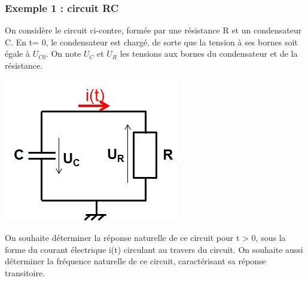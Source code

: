 \documentclass[]{report}
\begin{document}
	\subsubsection{Exemple 1 : circuit RC}
		
	\begin{minipage}[l]{0.7\linewidth}
		On considère le circuit ci-contre, formée par une résistance R et un condensateur C. En t= 0, le condensateur est chargé, de sorte que la tension à ses bornes soit égale à $U_{C0}$. On note $U_{C}$ et $U_{R}$ les tensions aux bornes du condensateur et de la résistance. 	
	\end{minipage} \hfill
	\begin{minipage}[r]{0.4\linewidth}
		\includegraphics[scale=0.5]{images/circuit_RC_reponse_naturelle.jpg} 	
	\end{minipage}
	\vspace{0.5\baselineskip}
	On souhaite déterminer la réponse naturelle de ce circuit pour t > 0, sous la forme du courant électrique i(t) circulant au travers du circuit. On souhaite aussi déterminer la fréquence naturelle de ce circuit, caractérisant sa réponse transitoire.
	
\end{document}
